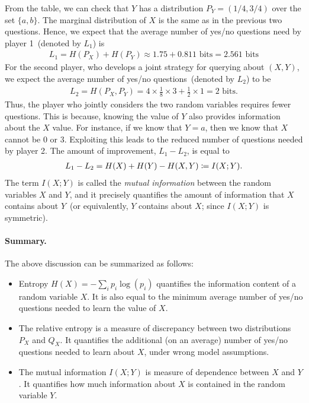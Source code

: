 \documentclass[12pt]{article}
\begin{document}
        From the table, we can check that $Y$ has a distribution $P_Y = (1/4, 3/4)$ over the set $\{a, b\}$. The marginal distribution of $X$ is the same as in the previous two questions. Hence, we expect that the average number of yes/no questions need by player 1~(denoted by $L_1$) is 
        \begin{align}
            L_1 = H(P_X) + H(P_Y) \approx 1.75 + 0.811 \text{ bits} = 2.561 \text{ bits}
        \end{align}
        For the second player, who develops a joint strategy for querying about $(X, Y)$, we expect the average number of yes/no questions~(denoted by $L_2$) to be 
        \begin{align}
            L_2 = H(P_X, P_Y) = 4\times \frac{1}{8}\times 3 + \frac{1}{2} \times 1 = 2 \text{ bits}. 
        \end{align}
        Thus, the player who jointly considers the two random variables requires fewer questions. This is because, knowing the value of $Y$ also provides information about the $X$ value. For instance, if we know that $Y=a$, then we know that $X$ cannot be $0$ or $3$. Exploiting this leads to the reduced number of questions needed by player 2. The amount of improvement, $L_1 - L_2$, is equal to 
        \begin{align}
            L_1 - L_2 = H(X) + H(Y) - H(X, Y) \coloneqq I(X; Y). 
        \end{align}
        The term $I(X; Y)$ is called the \emph{mutual information} between the random variables $X$ and $Y$, and it precisely quantifies the amount of information that $X$ contains about $Y$~(or equivalently, $Y$ contains about $X$; since $I(X; Y)$ is symmetric).  

        \paragraph{Summary.} The above discussion can be summarized as follows:
        \begin{itemize}
            \item Entropy $H(X) = -\sum_{i} p_i \log(p_i)$ quantifies the information content of a random variable $X$. It is also equal to the minimum average number of yes/no questions needed to learn the value of $X$. 
            \item The relative entropy is a measure of discrepancy between two distributions $P_X$ and $Q_X$. It quantifies the additional (on an average) number of yes/no questions needed to learn about $X$, under wrong model assumptions. 
            \item The mutual information $I(X; Y)$ is measure of dependence between $X$ and $Y$. It quantifies how much information about $X$ is contained in the random variable $Y$. 
        \end{itemize}
\end{document}
